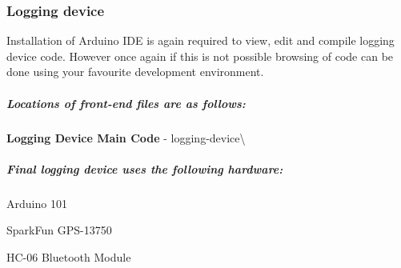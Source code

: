 \subsubsection*{Logging device}

Installation of Arduino I\+DE is again required to view, edit and compile logging device code. However once again if this is not possible browsing of code can be done using your favourite development environment.

\subparagraph*{Locations of front-\/end files are as follows\+:}


\begin{DoxyItemize}
\item {\bfseries Logging Device Main Code} -\/ logging-\/device\textbackslash{}
\end{DoxyItemize}

\subparagraph*{Final logging device uses the following hardware\+:}


\begin{DoxyItemize}
\item Arduino 101
\item Spark\+Fun G\+P\+S-\/13750
\item H\+C-\/06 Bluetooth Module 
\end{DoxyItemize}